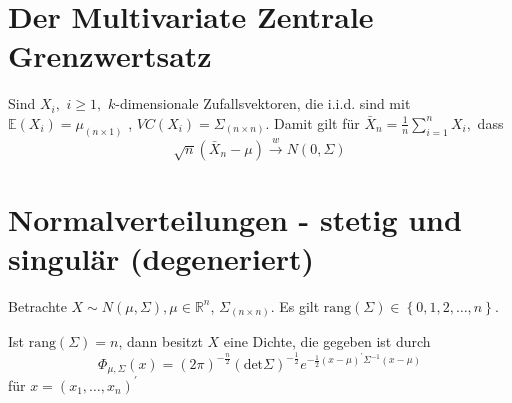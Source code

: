 \documentclass{tstextbook}
\begin{document}
\section{Der Multivariate Zentrale Grenzwertsatz}



\begin{theorem}[Satz]
	Sind $ X_i,$  $ i\ge 1, $  $ k $-dimensionale Zufallsvektoren, die i.i.d. sind mit $ \mathbb{E}(X_i)=\mu_{(n \times 1)} $  , $ VC(X_i) = \Sigma_{(n \times n)}. $
	Damit gilt für $ \bar{X}_n = \frac{1}{n} \sum_{i=1}^{n} X_i,$  dass 
	\[  \sqrt{n}(\bar{X}_n-\mu) \overset{w}{\longrightarrow} N(0, \Sigma) \]
\end{theorem}


\section{Normalverteilungen - stetig und singulär (degeneriert)}


Betrachte $ X \sim N(\mu, \Sigma),\mu \in \mathbb{R}^n $, $ \Sigma_{(n\times n)} $. Es gilt $ \text{rang}(\Sigma)\in \left\lbrace 0, 1, 2,\ldots, n\right\rbrace  $.

\begin{theorem}
	Ist $ \text{rang}(\Sigma)=n $, dann besitzt $ X $  eine Dichte, die gegeben ist durch
	\[ \Phi_{\mu, \Sigma} (x) = (2\pi)^{-\frac{n}{2}} (\text{det} \Sigma)^{-\frac{1}{2}} e^{-\frac{1}{2}(x-\mu)^\prime\Sigma^{-1}(x-\mu)} \] für $ x = \left( x_1,\ldots, x_n \right)^{\prime} $
\end{theorem}
\end{document}
